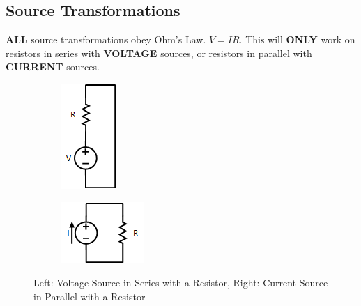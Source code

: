 \documentclass[10pt,letterpaper,final,twoside,notitlepage]{article}
\begin{document}
	\subsection*{Source Transformations} \label{sec:Source Transforms}
		\textbf{ALL} source transformations obey Ohm's Law. $V=IR$.
		This will \textbf{ONLY} work on resistors in series with \textbf{VOLTAGE} sources, or resistors in parallel with \textbf{CURRENT} sources.
		\begin{figure}[!htpb]
			\hspace{15mm}
			\begin{subfigure}
				\centering
				\includegraphics[scale=.3]{SeriesVoltageResistor.png}
				\label{fig:SeriesVoltageSource}
			\end{subfigure}
			\hspace{65mm}
			\begin{subfigure}
				\centering
				\includegraphics[scale=.4]{ParallelCurrentResistor.png}
				\label{fig:ParallelCurrentSource}
			\end{subfigure}
			\caption{Left: Voltage Source in Series with a Resistor, Right: Current Source in Parallel with a Resistor}
		\end{figure}
\end{document}
